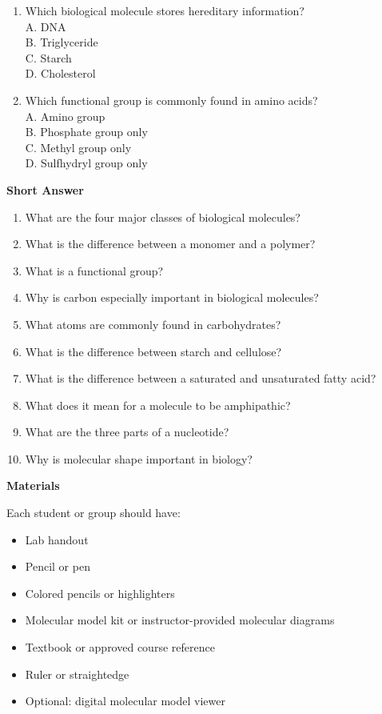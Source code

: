 \documentclass[
  letterpaper,
  DIV=11,
  numbers=noendperiod]{scrreprt}
\begin{document}
\begin{enumerate}
  C. Translation\\
  D. Diffusion
\item
  Which biological molecule stores hereditary information?\\
  A. DNA\\
  B. Triglyceride\\
  C. Starch\\
  D. Cholesterol
\item
  Which functional group is commonly found in amino acids?\\
  A. Amino group\\
  B. Phosphate group only\\
  C. Methyl group only\\
  D. Sulfhydryl group only
\end{enumerate}

\textbf{Short Answer}

\begin{enumerate}
\def\labelenumi{\arabic{enumi}.}
\setcounter{enumi}{10}
\item
  What are the four major classes of biological molecules?
\item
  What is the difference between a monomer and a polymer?
\item
  What is a functional group?
\item
  Why is carbon especially important in biological molecules?
\item
  What atoms are commonly found in carbohydrates?
\item
  What is the difference between starch and cellulose?
\item
  What is the difference between a saturated and unsaturated fatty acid?
\item
  What does it mean for a molecule to be amphipathic?
\item
  What are the three parts of a nucleotide?
\item
  Why is molecular shape important in biology?
\end{enumerate}

\textbf{Materials}

Each student or group should have:

\begin{itemize}
\item
  Lab handout
\item
  Pencil or pen
\item
  Colored pencils or highlighters
\item
  Molecular model kit or instructor-provided molecular diagrams
\item
  Textbook or approved course reference
\item
  Ruler or straightedge
\item
  Optional: digital molecular model viewer
\end{itemize}
\end{document}
